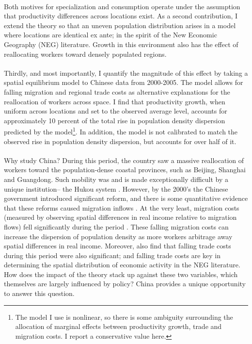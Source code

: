 \documentclass[]{article}
\begin{document}
\paragraph*{}  
 Both motives for specialization and consumption operate under the assumption that productivity differences across locations exist. As a second contribution, I extend the theory so that an uneven population distribution arises in a model where locations are identical ex ante; in the spirit of the New Economic Geography (NEG) literature.  Growth in this environment also has the effect of reallocating workers toward densely populated regions.
 \paragraph*{}
 Thirdly, and most importantly, I quantify the magnitude of this effect by taking a spatial equilibrium model to Chinese data from 2000-2005. The model allows for falling migration and regional trade costs as alternative explanations for the reallocation of workers across space. I find that productivity growth, when uniform across locations and set to the observed average level, accounts for approximately 10 percent of the total rise in population density dispersion predicted by the model\footnote{The model I use is nonlinear, so there is some ambiguity surrounding the allocation of marginal effects between productivity growth, trade and migration costs. I report a conservative value here.}. In addition, the model is not calibrated to match the observed rise in population density dispersion, but accounts for over half of it.
 \paragraph*{}
 Why study China? During this period, the country saw a massive reallocation of workers toward the population-dense coastal provinces, such as Beijing, Shanghai and Guangdong. Such mobility was and is made exceptionally difficult by a unique institution-- the Hukou system \citep{Chinashukou60} \citep{hukoulaboutcome}. However, by the 2000's the Chinese government introduced significant reform, and there is some quantitative evidence that these reforms caused migration inflows \citep{Fan2018HukouRI}. At the very least, migration costs (measured by observing spatial differences in real income relative to migration flows) fell significantly during the period \citep{tombezhu}. These falling migration costs can increase the dispersion of population density as more workers arbitrage away spatial differences in real income. Moreover, \citet{tombezhu} also find that falling trade costs during this period were also significant; and falling trade costs are key in determining the spatial distribution of economic activity in the NEG literature. How does the impact of the theory stack up against these two variables, which themselves are largely influenced by policy? China provides a unique opportunity to answer this question.
\end{document}
